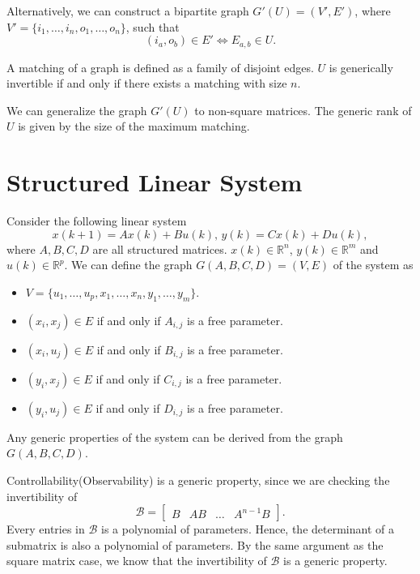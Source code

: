 \documentclass{article}
\begin{document}
Alternatively, we can construct a bipartite graph $G'(U) = (V',E')$, where $V' = \{i_1,\dots,i_n,o_1,\dots,o_n\}$, such that
\begin{displaymath}
  (i_a,o_b)\in E' \Leftrightarrow E_{a,b}\in U. 
\end{displaymath}

A matching of a graph is defined as a family of disjoint edges. $U$ is generically invertible if and only if there exists a matching with size $n$.

We can generalize the graph $G'(U)$ to non-square matrices. The generic rank of $U$ is given by the size of the maximum matching.
\section{Structured Linear System}
Consider the following linear system
\begin{displaymath}
 x(k+1) = A x(k) + B u(k),\, y(k) = C x(k) + D u(k), 
\end{displaymath}
where $A,B,C,D$ are all structured matrices. $x(k)\in \mathbb R^n$, $y(k)\in \mathbb R^m$ and $u(k)\in \mathbb R^p$. We can define the graph $G(A,B,C,D) = (V,E)$ of the system as
\begin{itemize}
  \item $V = \{u_1,\dots,u_p, x_1,\dots,x_n,y_1,\dots,y_m\}$. 
  \item $(x_i,x_j)\in E$ if and only if $A_{i,j}$ is a free parameter.
  \item $(x_i,u_j)\in E$ if and only if $B_{i,j}$ is a free parameter.
  \item $(y_i,x_j)\in E$ if and only if $C_{i,j}$ is a free parameter.
  \item $(y_i,u_j)\in E$ if and only if $D_{i,j}$ is a free parameter.
\end{itemize}
Any generic properties of the system can be derived from the graph $G(A,B,C,D)$.

Controllability(Observability) is a generic property, since we are checking the invertibility of
\begin{displaymath}
  \mathcal B = \begin{bmatrix}
    B&AB&\dots&A^{n-1}B
  \end{bmatrix}.
\end{displaymath}
Every entries in $\mathcal B$ is a polynomial of parameters. Hence, the determinant of a submatrix is also a polynomial of parameters. By the same argument as the square matrix case, we know that the invertibility of $\mathcal B$ is a generic property.
\end{document}
